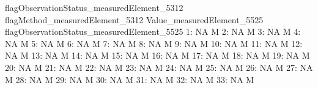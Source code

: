 \documentclass[nojss]{jss}
\begin{document}
\begin{Schunk}
\begin{Soutput}
     flagObservationStatus_measuredElement_5312 flagMethod_measuredElement_5312
     Value_measuredElement_5525 flagObservationStatus_measuredElement_5525
  1:                         NA                                          M
  2:                         NA                                          M
  3:                         NA                                          M
  4:                         NA                                          M
  5:                         NA                                          M
  6:                         NA                                          M
  7:                         NA                                          M
  8:                         NA                                          M
  9:                         NA                                          M
 10:                         NA                                          M
 11:                         NA                                          M
 12:                         NA                                          M
 13:                         NA                                          M
 14:                         NA                                          M
 15:                         NA                                          M
 16:                         NA                                          M
 17:                         NA                                          M
 18:                         NA                                          M
 19:                         NA                                          M
 20:                         NA                                          M
 21:                         NA                                          M
 22:                         NA                                          M
 23:                         NA                                          M
 24:                         NA                                          M
 25:                         NA                                          M
 26:                         NA                                          M
 27:                         NA                                          M
 28:                         NA                                          M
 29:                         NA                                          M
 30:                         NA                                          M
 31:                         NA                                          M
 32:                         NA                                          M
 33:                         NA                                          M

\end{Soutput}
\end{Schunk}
\end{document}
